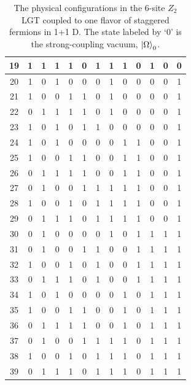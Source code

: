\documentclass[a4paper,onecolumn,11pt,accepted=2024-10-11]{quantumarticle}
\begin{document}
\begin{table}[ht!]
\begin{tabular}{|c||*{12}{c|}}
19 & 1 & 1 & 1 & 1 & 0 & 1 & 1 & 1 & 0 & 1 & 0 & 0 \\ \hline
20 & 1 & 0 & 1 & 0 & 0 & 0 & 1 & 0 & 0 & 0 & 0 & 1 \\ \hline
21 & 1 & 0 & 0 & 1 & 1 & 0 & 1 & 0 & 0 & 0 & 0 & 1 \\ \hline
22 & 0 & 1 & 1 & 1 & 1 & 0 & 1 & 0 & 0 & 0 & 0 & 1 \\ \hline
23 & 1 & 0 & 1 & 0 & 1 & 1 & 0 & 0 & 0 & 0 & 0 & 1 \\ \hline
24 & 1 & 0 & 1 & 0 & 0 & 0 & 0 & 1 & 1 & 0 & 0 & 1 \\ \hline
25 & 1 & 0 & 0 & 1 & 1 & 0 & 0 & 1 & 1 & 0 & 0 & 1 \\ \hline
26 & 0 & 1 & 1 & 1 & 1 & 0 & 0 & 1 & 1 & 0 & 0 & 1 \\ \hline
27 & 0 & 1 & 0 & 0 & 1 & 1 & 1 & 1 & 1 & 0 & 0 & 1 \\ \hline
28 & 1 & 0 & 0 & 1 & 0 & 1 & 1 & 1 & 1 & 0 & 0 & 1 \\ \hline
29 & 0 & 1 & 1 & 1 & 0 & 1 & 1 & 1 & 1 & 0 & 0 & 1 \\ \hline
30 & 0 & 1 & 0 & 0 & 0 & 0 & 1 & 0 & 1 & 1 & 1 & 1 \\ \hline
31 & 0 & 1 & 0 & 0 & 1 & 1 & 0 & 0 & 1 & 1 & 1 & 1 \\ \hline
32 & 1 & 0 & 0 & 1 & 0 & 1 & 0 & 0 & 1 & 1 & 1 & 1 \\ \hline
33 & 0 & 1 & 1 & 1 & 0 & 1 & 0 & 0 & 1 & 1 & 1 & 1 \\ \hline
34 & 1 & 0 & 1 & 0 & 0 & 0 & 0 & 1 & 0 & 1 & 1 & 1 \\ \hline
35 & 1 & 0 & 0 & 1 & 1 & 0 & 0 & 1 & 0 & 1 & 1 & 1 \\ \hline
36 & 0 & 1 & 1 & 1 & 1 & 0 & 0 & 1 & 0 & 1 & 1 & 1 \\ \hline
37 & 0 & 1 & 0 & 0 & 1 & 1 & 1 & 1 & 0 & 1 & 1 & 1 \\ \hline
38 & 1 & 0 & 0 & 1 & 0 & 1 & 1 & 1 & 0 & 1 & 1 & 1 \\ \hline
39 & 0 & 1 & 1 & 1 & 0 & 1 & 1 & 1 & 0 & 1 & 1 & 1 \\ \hline
\end{tabular}
    \caption{The physical configurations in the 6-site $Z_2$ LGT coupled to one flavor of staggered fermions in 1+1 D. The state labeled by `0' is the strong-coupling vacuum, $\ket{\Omega}_0$.}
    \label{tab:physical_z2}
\end{table}
%
%
\end{document}
